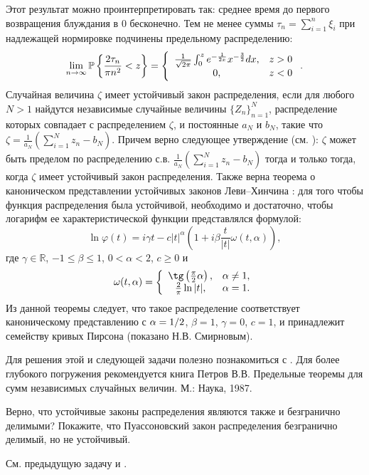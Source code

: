 \begin{remark}
Этот результат можно проинтерпретировать так: среднее время до первого возвращения блуждания в 0 бесконечно. 
Тем не менее суммы $\tau _{n} =\sum _{i=1}^{n}\xi _{i}  $ при надлежащей нормировке подчинены предельному распределению: 
\[\mathop{\lim }\limits_{n\to \infty } \mathrm{{\mathbb P}}\left\{\frac{2\tau _{n} }{\pi n^{2} } <z\right\}=\left\{\begin{array}{cc} {\frac{1}{\sqrt{2\pi } } \int _{0}^{z}e^{-\frac{1}{2x} } x^{-\frac{3}{2} }  dx,} & {z>0} \\ {0,} & {z<0} \end{array}\right. .\]  
Случайная величина $\zeta$ имеет устойчивый закон распределения, если для любого $N>1$ найдутся  независимые случайные величины $\{Z_n\}_{n=1}^N$, распределение которых совпадает с  распределением $\zeta$,  и постоянные $a_N$ и $b_N$, такие что $\zeta = \frac{1}{a_N}(\sum_{i=1}^N z_n - b_N)$. Причем верно следующее утверждение (см. \cite{21}): $\zeta$ может быть пределом по распределению с.в. $\frac{1}{a_N}(\sum_{i=1}^N z_n - b_N)$ тогда и только тогда, когда $\zeta$ имеет устойчивый закон распределения.  Также верна теорема о каноническом представлении устойчивых законов  Леви--Хинчина \cite{1}: для того чтобы функция распределения была устойчивой, необходимо и достаточно, чтобы логарифм ее характеристической функции представлялся формулой:
\[\ln \varphi (t)=i\gamma t-c|t|^{\alpha } \left(1+i\beta \frac{t}{|t|} \omega (t,\alpha )\right),\] 
где $\gamma\in\mathbb{R}$, $-1\le \beta \le 1$, $0<\alpha < 2$, $c\ge 0$ и
\[\omega (t,\alpha )=\left\{\begin{array}{cc} {\tg\left(\frac{\pi }{2} \alpha \right),} & {\alpha \ne 1,} \\ {\frac{2}{\pi } \ln |t|,} & {\alpha =1}. \end{array}\right. \] 
Из данной теоремы следует, что такое распределение соответствует каноническому представлению с $\alpha ={1\mathord{\left/ {\vphantom {1 2}} \right. \kern-\nulldelimiterspace} 2} $, $\beta =1$, $\gamma =0$, $c=1$, и принадлежит семейству кривых Пирсона (показано Н.В. Смирновым).



Для решения этой и следующей задачи полезно познакомиться с \cite{28}. Для более глубокого погружения рекомендуется книга Петров В.В. Предельные теоремы для сумм независимых случайных величин. М.: Наука, 1987. 
\end{remark}

\begin{problem}
Верно, что устойчивые законы  распределения являются также и  безгранично делимыми? 
 Покажите, что Пуассоновский закон распределения безгранично делимый, но не устойчивый. 
\end{problem}
\begin{remark}
См. предыдущую задачу и \cite{stoianov}.
\end{remark}

